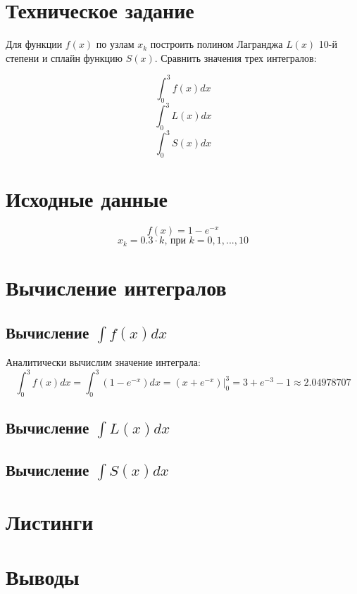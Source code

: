 





\section{Техническое задание}

Для функции $f(x)$ по узлам $x_k$ построить полином Лагранджа $L(x)$ 10-й степени и сплайн функцию $S(x)$. Сравнить значения трех интегралов:

\begin{multicols}{3}
	\noindent 
	\[\int_0^3 f(x)dx\]
	\[\int_0^3 L(x)dx\]
	\[\int_0^3 S(x)dx\]
\end{multicols}

\section{Исходные данные}
\vspace{-0.5cm}
\[
f(x) = 1 - e^{-x}
\]
\[
x_k = 0.3 \cdot k\text{, при }k = 0, 1, ..., 10
\]

\section{Вычисление интегралов}

\subsection{Вычисление $\int f(x)dx$}

Аналитически вычислим значение интеграла:
\vspace{-0.2cm}
\[
\int_0^3 f(x)dx = \int_0^3 \left(1 - e^{-x}\right) dx = \left.\left( x + e^{-x} \right)\right\vert_0^3 = 3 + e^{-3} - 1 \approx 2.04978707
\]

\subsection{Вычисление $\int L(x)dx$}

\subsection{Вычисление $\int S(x)dx$}

\section{Листинги}


\parindent=1cm %

\section{Выводы}


